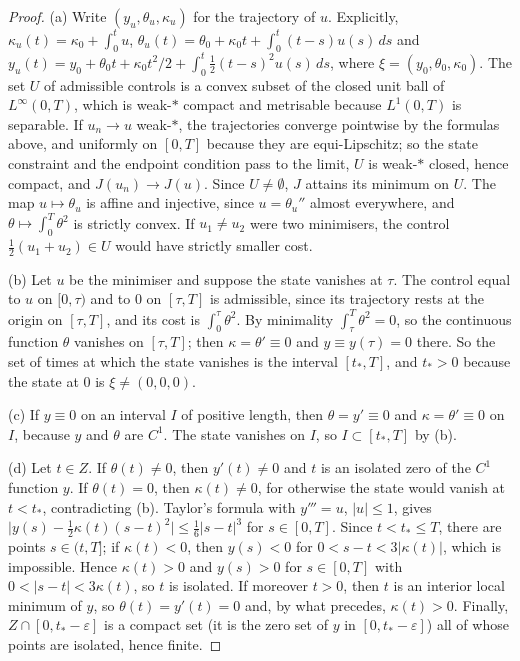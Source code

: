 \documentclass[11pt,reqno]{amsart}
\theoremstyle{definition}
\numberwithin{equation}{section}
\begin{document}
\begin{proof}
(a) Write $(y_u,\theta_u,\kappa_u)$ for the trajectory of $u$. Explicitly,
$\kappa_u(t)=\kappa_0+\int_0^tu$, $\theta_u(t)=\theta_0+\kappa_0t+\int_0^t(t-s)u(s)\,ds$ and
$y_u(t)=y_0+\theta_0t+\kappa_0t^2/2+\int_0^t\tfrac12(t-s)^2u(s)\,ds$, where $\xi=(y_0,\theta_0,\kappa_0)$.
The set $U$ of admissible controls is a convex subset of the closed unit ball of $L^\infty(0,T)$, which
is weak-$*$ compact and metrisable because $L^1(0,T)$ is separable. If $u_n\to u$ weak-$*$, the
trajectories converge pointwise by the formulas above, and uniformly on $[0,T]$ because they are
equi-Lipschitz; so the state constraint and the endpoint condition pass to the limit, $U$ is
weak-$*$ closed, hence compact, and $J(u_n)\to J(u)$. Since $U\ne\emptyset$, $J$ attains its minimum
on $U$. The map $u\mapsto\theta_u$ is affine and injective, since $u=\theta_u''$ almost everywhere,
and $\theta\mapsto\int_0^T\theta^2$ is strictly convex. If $u_1\ne u_2$ were two minimisers, the
control $\tfrac12(u_1+u_2)\in U$ would have strictly smaller cost.

(b) Let $u$ be the minimiser and suppose the state vanishes at $\tau$. The control equal to $u$ on
$[0,\tau)$ and to $0$ on $[\tau,T]$ is admissible, since its trajectory rests at the origin on
$[\tau,T]$, and its cost is $\int_0^\tau\theta^2$. By minimality $\int_\tau^T\theta^2=0$, so the
continuous function $\theta$ vanishes on $[\tau,T]$; then $\kappa=\theta'\equiv0$ and
$y\equiv y(\tau)=0$ there. So the set of times at which the state vanishes is the interval $[t_*,T]$,
and $t_*>0$ because the state at $0$ is $\xi\ne(0,0,0)$.

(c) If $y\equiv0$ on an interval $I$ of positive length, then $\theta=y'\equiv0$ and
$\kappa=\theta'\equiv0$ on $I$, because $y$ and $\theta$ are $C^1$. The state vanishes on $I$, so
$I\subset[t_*,T]$ by (b).

(d) Let $t\in Z$. If $\theta(t)\ne0$, then $y'(t)\ne0$ and $t$ is an isolated zero of the $C^1$
function $y$. If $\theta(t)=0$, then $\kappa(t)\ne0$, for otherwise the state would vanish at
$t<t_*$, contradicting (b). Taylor's formula with $y'''=u$, $|u|\le1$, gives
$\big|y(s)-\tfrac12\kappa(t)(s-t)^2\big|\le\tfrac16|s-t|^3$ for $s\in[0,T]$. Since $t<t_*\le T$, there
are points $s\in(t,T]$; if $\kappa(t)<0$, then $y(s)<0$ for $0<s-t<3|\kappa(t)|$, which is impossible.
Hence $\kappa(t)>0$ and $y(s)>0$ for $s\in[0,T]$ with $0<|s-t|<3\kappa(t)$, so $t$ is isolated. If
moreover $t>0$, then $t$ is an interior local minimum of $y$, so $\theta(t)=y'(t)=0$ and, by what
precedes, $\kappa(t)>0$. Finally, $Z\cap[0,t_*-\varepsilon]$ is a compact set (it is the zero set of
$y$ in $[0,t_*-\varepsilon]$) all of whose points are isolated, hence finite.
\end{proof}
\end{document}
